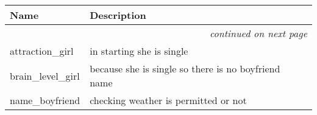     \vspace{-1cm}
\hspace{\varindent}\begin{longtable}{|p{\varnamewidth}|p{\vardescrwidth}|l}
\cline{1-2}
\cline{1-2} \centering \textbf{Name} & \centering \textbf{Description}& \\
\cline{1-2}
\endhead\cline{1-2}\multicolumn{3}{r}{\small\textit{continued on next page}}\\\endfoot\cline{1-2}
\endlastfoot\raggedright a\-t\-t\-r\-a\-c\-t\-i\-o\-n\-\_\-g\-i\-r\-l\- & in starting she is single&\\
\cline{1-2}
\raggedright b\-r\-a\-i\-n\-\_\-l\-e\-v\-e\-l\-\_\-g\-i\-r\-l\- & because she is single so there is no boyfriend name&\\
\cline{1-2}
\raggedright n\-a\-m\-e\-\_\-b\-o\-y\-f\-r\-i\-e\-n\-d\- & checking weather is permitted or not&\\
\cline{1-2}
\end{longtable}

